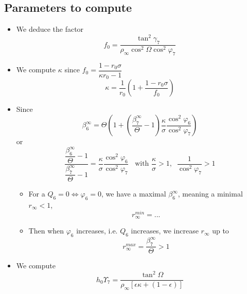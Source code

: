 \documentclass[aps,onecolumn,10pt]{revtex4}
\begin{document}
\subsection{Parameters to compute}

\begin{itemize}
\item We deduce the factor
\begin{equation}
f_0  = \dfrac{\tan^2 \gamma_7}{\rho_\infty \cos^2\Omega \cos^2\varphi_7}
\end{equation}

\item We compute $\kappa$ since $f_0=\dfrac{1-r_0\sigma}{\kappa r_0-1}$
\begin{equation}
	\kappa = \dfrac{1}{r_0}\left( 1 + \dfrac{1-r_0\sigma}{f_0}\right)
\end{equation}

\item Since
	$$
		\beta_6^\infty = \Theta \left( 1 + \left(\dfrac{\beta_7^\infty}{\Theta}-1\right) \dfrac{\kappa}{\sigma} \dfrac{\cos^2\varphi_6}{\cos^2\varphi_7} \right)
	$$
or
\begin{equation}
	\dfrac
	{ 
		\dfrac{\beta_6^\infty}{\Theta}-1
	}
	{
		\dfrac{\beta_7^\infty}{\Theta}-1
	} = \dfrac{\kappa}{\sigma} \dfrac{\cos^2\varphi_6}{\cos^2\varphi_7} \;\; \text{ with } \dfrac{\kappa}{\sigma}>1, \;\; \dfrac{1}{\cos^2\varphi_7}>1
\end{equation}
\begin{itemize}
\item For a $Q_6=0 \Leftrightarrow \varphi_6=0$, we have a maximal $\beta_6^\infty$, meaning a minimal $r_\infty<1$, 
\begin{equation}
	r_\infty^{min} = ...
\end{equation}

\item Then when $\varphi_6$ increases, i.e. $Q_6$ increases, we increase $r_\infty$ up to 
\begin{equation}
		r_\infty^{max} = \frac{\beta_7^\infty}{\Theta} > 1
\end{equation}

\end{itemize}

\item We compute
\begin{equation}
	h_0 \Upsilon_7 = \dfrac{\tan^2\Omega}{\rho_\infty\left[\epsilon\kappa+(1-\epsilon)\right]}
\end{equation}


\end{itemize}
\end{document}
